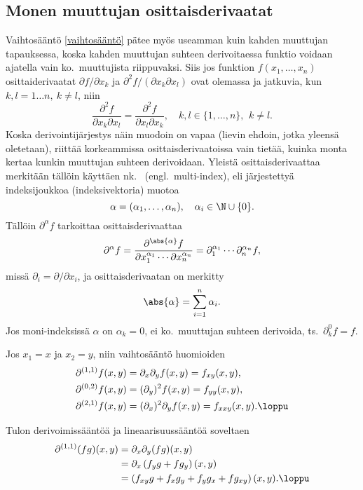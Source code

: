 \subsection*{Monen muuttujan osittaisderivaatat}

Vaihtosääntö \eqref{vaihtosääntö} pätee myös useamman kuin kahden muuttujan tapauksessa, koska
kahden muuttujan suhteen derivoitaessa funktio voidaan ajatella vain ko.\ muuttujista
riippuvaksi. Siis jos funktion $f(x_1,\ldots,x_n)$ osittaiderivaatat
$\partial f/\partial x_k$ ja $\partial^2 f/(\partial x_k\partial x_l)$ ovat olemassa ja
jatkuvia, kun $k,l=1 \ldots n,\ k \neq l$, niin
\[
\frac{\partial^2 f}{\partial x_k\partial x_l}
    =\frac{\partial^2 f}{\partial x_l\partial x_k},\quad k,l\in\{1,\ldots,n\},\,\ k \neq l.
\]
Koska derivointijärjestys näin muodoin on vapaa (lievin ehdoin, jotka yleensä oletetaan),
riittää korkeammissa osittaisderivaatoissa vain tietää, kuinka monta kertaa kunkin muuttujan
suhteen derivoidaan. Yleistä osittaisderivaattaa merkitään tällöin käyttäen nk.\
 (engl.\ multi-index), eli järjestettyä indeksijoukkoa (indeksivektoria)
muotoa
\[
\alpha=(\alpha_1,\ldots,\alpha_n),\quad \alpha_i\in\N\cup\{0\}.
\]
Tällöin $\partial^\alpha f$ tarkoittaa osittaisderivaattaa
\[
\partial^\alpha f
=\frac{\partial^{\abs{\alpha}} f}{\partial x_1^{\alpha_1}\cdots\partial x_n^{\alpha_n}}
=\partial_1^{\alpha_1}\cdots\partial_n^{\alpha_n} f,
\]
%
missä $\partial_i=\partial/\partial x_i$, ja osittaisderivaatan  on merkitty
\[
\abs{\alpha}=\sum_{i=1}^n \alpha_i.
\]
Jos moni-indeksissä $\alpha$ on $\alpha_k=0$, ei ko.\ muuttujan suhteen derivoida, ts.\
$\partial_k^0 f=f$.
\begin{Exa} Jos $x_1=x$ ja $x_2=y$, niin vaihtosääntö huomioiden
\begin{align*}
\partial^{(1,1)}f(x,y)    &= \partial_x\partial_y f(x,y) = f_{xy}(x,y), \\
\partial^{(0,2)}f(x,y)    &= (\partial_y)^2 f(x,y) = f_{yy}(x,y), \\
\partial^{(2,1)}f(x,y)    &= (\partial_x)^2\partial_y f(x,y) = f_{xxy}(x,y). \loppu
\end{align*}
\end{Exa}
\begin{Exa} Tulon derivoimissääntöä ja lineaarisuussääntöä soveltaen
\begin{align*}
\partial^{(1,1)}(fg)(x,y) &= \partial_x\partial_y (fg)(x,y) \\
                         &= \partial_x\left(f_yg+fg_y\right)(x,y) \\
                         &= \left(f_{xy}g+f_xg_y+f_yg_x+fg_{xy}\right)(x,y). \loppu
\end{align*}
\end{Exa}
